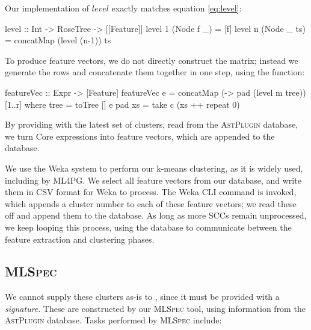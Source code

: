 Our implementation of $level$ exactly matches equation \ref{eq:level}:

\begin{haskell}
level :: Int -> RoseTree -> [[Feature]]
level 1 (Node f _)  = [f]
level n (Node _ ts) = concatMap (level (n-1)) ts
\end{haskell}

To produce feature vectors, we do not directly construct the matrix; instead we
generate the rows and concatenate them together in one step, using the
 function:

\begin{haskell}
featureVec :: Expr -> [Feature]
featureVec e = concatMap (\m -> pad (level m tree)) [1..r]
  where tree   = toTree [] e
        pad xs = take c (xs ++ repeat 0)
\end{haskell}

By providing  with the latest set of clusters, read from the
\textsc{AstPlugin} database, we turn Core expressions into feature vectors,
which are appended to the database.

We use the Weka system to perform our k-means clustering, as it is widely used,
including by ML4PG. We select all feature vectors from our database, and write
them in CSV format for Weka to process. The Weka CLI command is invoked, which
appends a cluster number to each of these feature vectors; we read these off and
append them to the database. As long as more SCCs remain unprocessed, we keep
looping this process, using the database to communicate between the feature
extraction and clustering phases.

\subsection{\textsc{MLSpec}}
\label{sec:mlspec}

We cannot supply these clusters as-is to \qspec{}, since it must be provided
with a \emph{signature}. These are constructed by our \textsc{MLSpec} tool,
using information from the \textsc{AstPlugin} database. Tasks performed by
\textsc{MLSpec} include:

